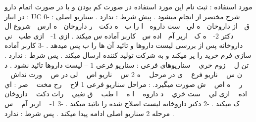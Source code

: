 مورد استفاده : ثبت نام
اين مورد استفاده در صورت کم بودن و يا در صورت اتمام دارو در انبار : UC شرح مختصر از
انجام ميشود .
پيش شرط : ندارد .
سناريو اصلی :
-0 شروع
ال 􀑧 ه ارس 􀑧 ر داروخان 􀑧 ه دکت 􀑧 ا را ب 􀑧 ست داروه 􀑧 ه لي 􀑧 از داروخان 􀑧 ق ني 􀑧 ازی طب 􀑧 -1 کاربر آماده س
ميکند .
ازی 􀑧 اده س 􀑧 اربر آم 􀑧 ه ک 􀑧 -2 دکتر داروخانه پس از بررسی ليست داروها و تائيد آن ها را ب
پس ميدهد .
-3 کاربر آماده سازی فرم خريد را پر ميکند و به شرکت توليد کننده ارسال ميکند .
پس شرط : ندارد .
سناريوهای فرعی :
سناريو فرعی 1 – ليست داروها تائيد نشود .
د 􀑧􀑧 زوم خري 􀑧􀑧 تن ل 􀑧􀑧 ورت نداش 􀑧􀑧 لی در ص 􀑧􀑧 ناريو اص 􀑧􀑧 ه 2 س 􀑧􀑧 ی در مرحل 􀑧􀑧 ناريو فرع 􀑧􀑧 ن س 􀑧􀑧 صر : اي 􀑧􀑧 رح مخت 􀑧􀑧 ش
صورت ميگيرد.
: مراحل سناريو فرعی 1
لاح 􀑧􀑧 ه اص 􀑧􀑧 ر داروخان 􀑧􀑧 رات دکت 􀑧􀑧 ق تغيي 􀑧􀑧 ا طب 􀑧􀑧 ا ه 􀑧􀑧 د داروه 􀑧􀑧 ست خري 􀑧􀑧 ازی لي 􀑧􀑧 اده س 􀑧􀑧 اربر آم 􀑧􀑧 -1 ک
ميکند .
-2 دکتر داروخانه ليست اصلاح شده را تائيد ميکند .
-3 مرحله 2 سناريو اصلی ادامه پيدا ميکند .
پس شرط : ندارد .